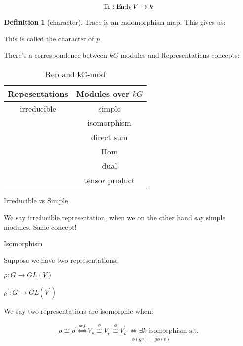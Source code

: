 \documentclass{article}
\theoremstyle{definition}
\newtheorem*{definition}{Definition}
\newcommand{\End}{\operatorname{End}}
\begin{document}
\[
    \Tr:\End_k V \to k
\]

\begin{definition}[character]
    Trace is an endomorphism map. This gives us:

    \begin{center}
    \end{center}

    This is called the \underline{character of \(p\)} 
\end{definition}

There's a correspondence between \(kG\) modules and Representations concepts:

\begin{table}[H]
    \centering
    \begin{tabular}{c|c}
        \toprule
            Repesentations &  Modules over \(kG\)  \\
        \midrule
            irreducible &  simple \\
             &  isomorphism \\
             &  direct sum \\
             &  Hom \\
             &  dual \\
             &  tensor product \\
        \bottomrule
    \end{tabular}
    \caption{Rep and kG-mod}
    \label{tab:repmod}
\end{table}

\underline{Irreducible vs Simple} 

We say irreducible representation, when we on the other hand say simple modules. Same concept!

\underline{Isomorphism} 

Suppose we have two representations:

\(\rho : G \to GL(V)\) 

\(\rho ^{\prime} : G \to GL(V^{\prime})\) 

We say two representations are isomorphic when:

\[
    \rho \cong \rho ^{\prime} \overset{def}{\iff} V_{\rho} \overset{\phi}{\cong} \underset{\phi(gv)=g \phi(v)}{V_{\rho} \overset{\phi}{\cong} V^{\prime} _{\rho ^{\prime}} \iff \exists k \text{ isomorphism s.t.} } 
\]
\end{document}
